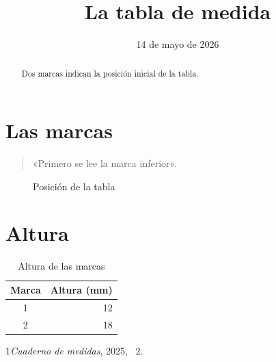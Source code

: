 \documentclass{article}
\begin{document}
\title{La tabla de medida}\author{}\date{14 de mayo de 2026}\maketitle
\begin{abstract}Dos marcas indican la posición inicial de la tabla.\end{abstract}
\tableofcontents
\section{Las marcas}\begin{quote}«Primero se lee la marca inferior».\end{quote}
\begin{figure}[ht]\centering\fbox{\rule{0pt}{8mm}\rule{33mm}{0pt}}\caption{Posición de la tabla}\end{figure}
\section{Altura}
\begin{table}[ht]\centering\begin{tabular}{cr}Marca&Altura (mm)\\\hline 1&12\\2&18\end{tabular}\caption{Altura de las marcas}\end{table}
\begin{thebibliography}{1}\emph{Cuaderno de medidas}, 2025, \chaptername~2.\end{thebibliography}
\end{document}
